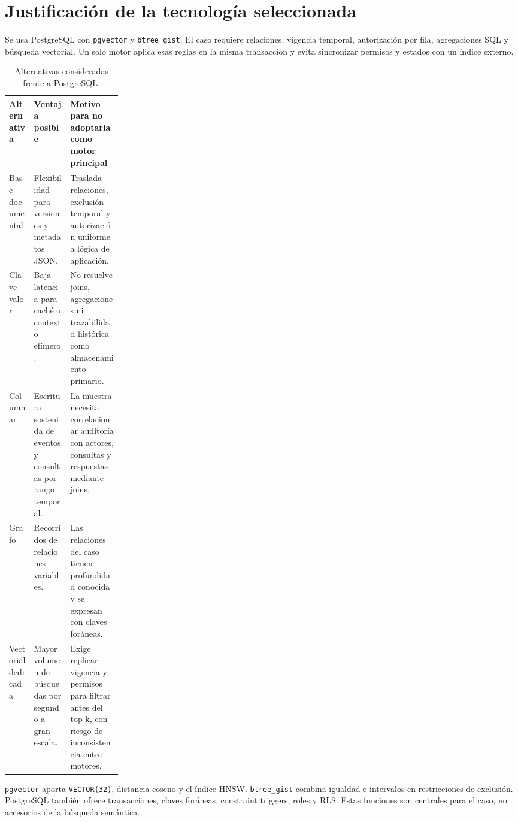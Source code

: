 \section{Justificación de la tecnología seleccionada}

Se usa PostgreSQL con \texttt{pgvector} y \texttt{btree\_gist}. El caso requiere
relaciones, vigencia temporal, autorización por fila, agregaciones SQL y
búsqueda vectorial. Un solo motor aplica esas reglas en la misma transacción y
evita sincronizar permisos y estados con un índice externo.

\begin{table}[ht]
\centering
\small
\begin{tabularx}{\textwidth}{>{\raggedright\arraybackslash}p{0.22\linewidth}Y Y}
\toprule
Alternativa & Ventaja posible & Motivo para no adoptarla como motor principal \\
\midrule
Base documental & Flexibilidad para versiones y metadatos JSON. & Traslada relaciones, exclusión temporal y autorización uniforme a lógica de aplicación. \\
Clave--valor & Baja latencia para caché o contexto efímero. & No resuelve joins, agregaciones ni trazabilidad histórica como almacenamiento primario. \\
Columnar & Escritura sostenida de eventos y consultas por rango temporal. & La muestra necesita correlacionar auditoría con actores, consultas y respuestas mediante joins. \\
Grafo & Recorridos de relaciones variables. & Las relaciones del caso tienen profundidad conocida y se expresan con claves foráneas. \\
Vectorial dedicada & Mayor volumen de búsquedas por segundo a gran escala. & Exige replicar vigencia y permisos para filtrar antes del top-k, con riesgo de inconsistencia entre motores. \\
\bottomrule
\end{tabularx}
\caption{Alternativas consideradas frente a PostgreSQL.}
\end{table}

\texttt{pgvector} aporta \texttt{VECTOR(32)}, distancia coseno y el índice HNSW.
\texttt{btree\_gist} combina igualdad e intervalos en restricciones de
exclusión. PostgreSQL también ofrece transacciones, claves foráneas, constraint
triggers, roles y RLS. Estas funciones son centrales para el caso, no accesorios
de la búsqueda semántica.
